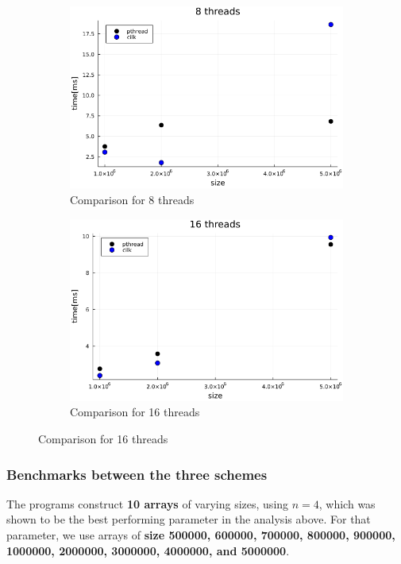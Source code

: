 \documentclass[11pt,a4paper,onecolumn,final]{article}
\begin{document}
\begin{figure}
    \begin{subfigure}{.5\textwidth}
        \centering
        \includegraphics[width=.9\linewidth]{../data/image/thread/8-threads.png}
        \caption{Comparison for 8 threads}
    \end{subfigure}%
    \begin{subfigure}{.5\textwidth}
        \centering
        \includegraphics[width=.9\linewidth]{../data/image/thread/16-threads.png}
        \caption{Comparison for 16 threads}
    \end{subfigure}
\end{figure}

\subsubsection{Benchmarks between the three schemes}
The programs construct \textbf{10 arrays} of varying sizes, using $n=4$, which was shown to be the best performing parameter in the analysis above. For that parameter, we use arrays of \textbf{size 500000, 600000, 700000, 800000, 900000, 1000000, 2000000, 3000000, 4000000, and 5000000}.
\end{document}
